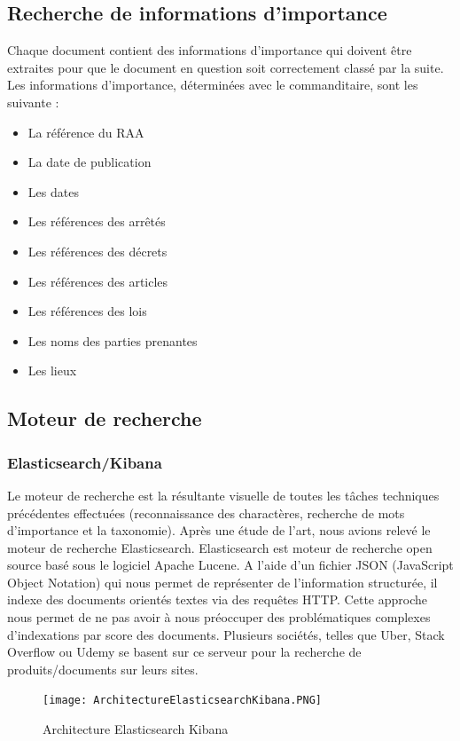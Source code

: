 \subsection{Recherche de informations d'importance} %
Chaque document contient des informations d'importance qui doivent être extraites pour que le document en question soit correctement classé par la suite.
Les informations d'importance, déterminées avec le commanditaire, sont les suivante :
\begin {itemize}
\item La référence du RAA
\item La date de publication
\item Les dates
\item Les références des arrêtés
\item Les références des décrets
\item Les références des articles
\item Les références des lois
\item Les noms des parties prenantes
\item Les lieux
\end {itemize}

 

\subsection{Moteur de recherche} %
\subsubsection{Elasticsearch/Kibana}
Le moteur de recherche est la résultante visuelle de toutes les tâches techniques précédentes effectuées (reconnaissance des charactères, recherche de mots d’importance et la taxonomie). Après une étude de l’art, nous avions relevé le moteur de recherche Elasticsearch. 
Elasticsearch est moteur de recherche open source basé sous le logiciel Apache Lucene. A l’aide d’un fichier JSON (JavaScript Object Notation) qui nous permet de représenter de l’information structurée, il indexe des documents orientés textes via des requêtes HTTP. Cette approche nous permet de ne pas avoir à nous préoccuper des problématiques complexes d’indexations par score des documents. Plusieurs sociétés, telles que Uber, Stack Overflow ou Udemy se basent sur ce serveur pour la recherche de produits/documents sur leurs sites. 

\begin{figure}[h!]
  \centering
  \texttt{[image: ArchitectureElasticsearchKibana.PNG]}
	\caption[]{Architecture Elasticsearch Kibana}
  \label{}
\end{figure}


